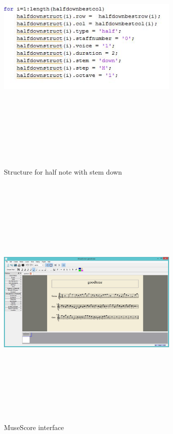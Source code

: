 \documentclass[journal]{IEEEtran}
\begin{document}
\begin{figure}
\includegraphics[width=3.5in,height=5.0in,clip,keepaspectratio]{resources/implementation/symbol_interpretation}
\centering
\caption{Structure for half note with stem down}
\end{figure}

\begin{figure}
\includegraphics[width=3.5in,height=5.0in,clip,keepaspectratio]{resources/implementation/playback}
\centering
\caption{MuseScore interface}
\end{figure}	
\end{document}
